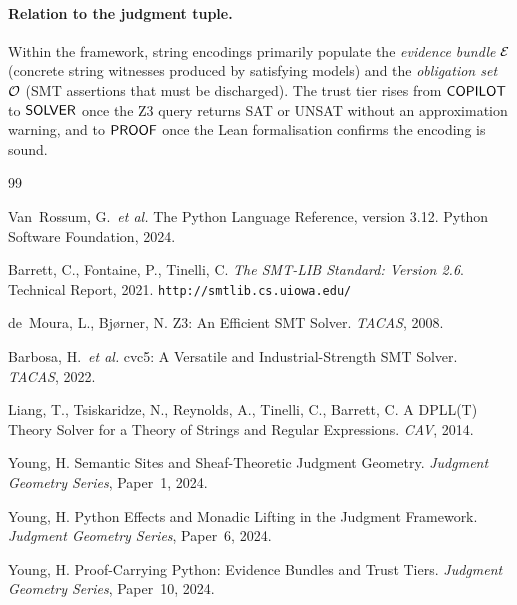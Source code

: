\documentclass[11pt]{article}
\begin{document}
\paragraph{Relation to the judgment tuple.}
Within the \JuGeo{} framework, string encodings primarily populate the
\emph{evidence bundle} $\mathcal{E}$ (concrete string witnesses produced by
satisfying models) and the \emph{obligation set} $\mathcal{O}$ (SMT assertions
that must be discharged).  The trust tier rises from $\mathsf{COPILOT}$ to
$\mathsf{SOLVER}$ once the Z3 query returns SAT or UNSAT without an approximation
warning, and to $\mathsf{PROOF}$ once the Lean formalisation confirms the encoding
is sound.

\begin{thebibliography}{99}

Van~Rossum, G.\ \textit{et al.}
The Python Language Reference, version 3.12.
Python Software Foundation, 2024.

Barrett, C., Fontaine, P., Tinelli, C.
\textit{The SMT-LIB Standard: Version 2.6}.
Technical Report, 2021.
\texttt{http://smtlib.cs.uiowa.edu/}

de~Moura, L., Bj{\o}rner, N.
Z3: An Efficient SMT Solver.
\textit{TACAS}, 2008.

Barbosa, H.\ \textit{et al.}
cvc5: A Versatile and Industrial-Strength SMT Solver.
\textit{TACAS}, 2022.

Liang, T., Tsiskaridze, N., Reynolds, A., Tinelli, C., Barrett, C.
A DPLL(T) Theory Solver for a Theory of Strings and Regular Expressions.
\textit{CAV}, 2014.

Young, H.
Semantic Sites and Sheaf-Theoretic Judgment Geometry.
\textit{Judgment Geometry Series}, Paper~1, 2024.

Young, H.
Python Effects and Monadic Lifting in the Judgment Framework.
\textit{Judgment Geometry Series}, Paper~6, 2024.

Young, H.
Proof-Carrying Python: Evidence Bundles and Trust Tiers.
\textit{Judgment Geometry Series}, Paper~10, 2024.

\end{thebibliography}
\end{document}
